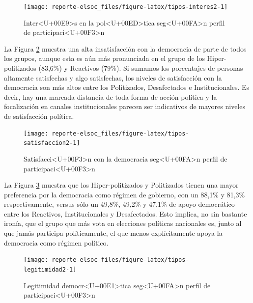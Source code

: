\documentclass[
  12pt,
]{book}
\begin{document}
\begin{figure}

{\centering \texttt{[image: reporte-elsoc\_files/figure-latex/tipos-interes2-1]} 

}

\caption{Inter<U+00E9>s en la pol<U+00ED>tica seg<U+00FA>n perfil de participaci<U+00F3>n}\label{fig:tipos-interes2}
\end{figure}

La Figura \ref{fig:tipos-satisfaccion2} muestra una alta insatisfacción con la democracia de parte de todos los grupos, aunque esta es aún más pronunciada en el grupo de los Hiper-politizados (83,6\%) y Reactivos (79\%). Si sumamos los porcentajes de personas altamente satisfechas y algo satisfechas, los niveles de satisfacción con la democracia son más altos entre los Politizados, Desafectados e Institucionales. Es decir, hay una marcada distancia de toda forma de acción política y la focalización en canales institucionales parecen ser indicativos de mayores niveles de satisfacción política.

\begin{figure}

{\centering \texttt{[image: reporte-elsoc\_files/figure-latex/tipos-satisfaccion2-1]} 

}

\caption{Satisfacci<U+00F3>n con la democracia seg<U+00FA>n perfil de participaci<U+00F3>n}\label{fig:tipos-satisfaccion2}
\end{figure}

La Figura \ref{fig:tipos-legitimidad2} muestra que los Hiper-politizados y Politizados tienen una mayor preferencia por la democracia como régimen de gobierno, con un 88,1\% y 81,3\% respectivamente, versus sólo un 49,8\%, 49,2\% y 47,1\% de apoyo democrático entre los Reactivos, Institucionales y Desafectados. Esto implica, no sin bastante ironía, que el grupo que más vota en elecciones políticas nacionales es, junto al que jamás participa políticamente, el que menos explícitamente apoya la democracia como régimen político.

\begin{figure}

{\centering \texttt{[image: reporte-elsoc\_files/figure-latex/tipos-legitimidad2-1]} 

}

\caption{Legitimidad democr<U+00E1>tica seg<U+00FA>n perfil de participaci<U+00F3>n}\label{fig:tipos-legitimidad2}
\end{figure}
\end{document}
